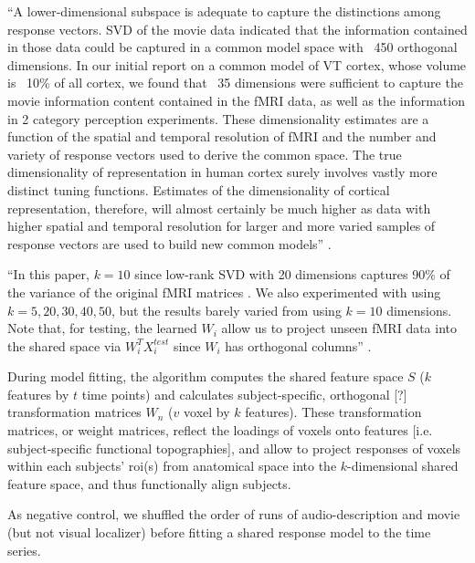 ``A lower-dimensional subspace is adequate to capture the distinctions among
response vectors. SVD of the movie data indicated that the information contained
in those data could be captured in a common model space with ~450 orthogonal
dimensions. In our initial report on a common model of VT cortex, whose volume
is ~10\% of all cortex, we found that ~35 dimensions were sufficient to capture
the movie information content contained in the fMRI data, as well as the
information in 2 category perception experiments. These dimensionality estimates
are a function of the spatial and temporal resolution of fMRI and the number and
variety of response vectors used to derive the common space. The true
dimensionality of representation in human cortex surely involves vastly more
distinct tuning functions. Estimates of the dimensionality of cortical
representation, therefore, will almost certainly be much higher as data with
higher spatial and temporal resolution for larger and more varied samples of
response vectors are used to build new common models''
\citep{guntupalli2016model}.

``In this paper, $k=10$ since low-rank SVD with 20 dimensions captures 90\% of
the variance of the original fMRI matrices \citep{chen2015reduced}. We also
experimented with using $k=5,20,30,40,50$, but the results barely varied from
using $k=10$ dimensions.  Note that, for testing, the learned $W_{i}$ allow us
to project unseen fMRI data into the shared space via $W_{i}^{T}X_{i}^{test}$
since $W_{i}$ has orthogonal columns'' \citep{vodrahalli2018mapping}.

%
During model fitting, the algorithm computes the shared feature space $S$ ($k$
features by $t$ time points) and calculates subject-specific, orthogonal [?]
transformation matrices $W_{n}$ ($v$ voxel by $k$ features).
%
These transformation matrices, or weight matrices, reflect the loadings of
voxels onto features [i.e. subject-specific functional topographies], and allow
to project responses of voxels within each subjects' \ac{roi}(s) from anatomical
space into the $k$-dimensional shared feature space, and thus functionally align
subjects.


As negative control, we shuffled the order of runs of audio-description and
movie (but not visual localizer) before fitting a shared response model to the
time series.


